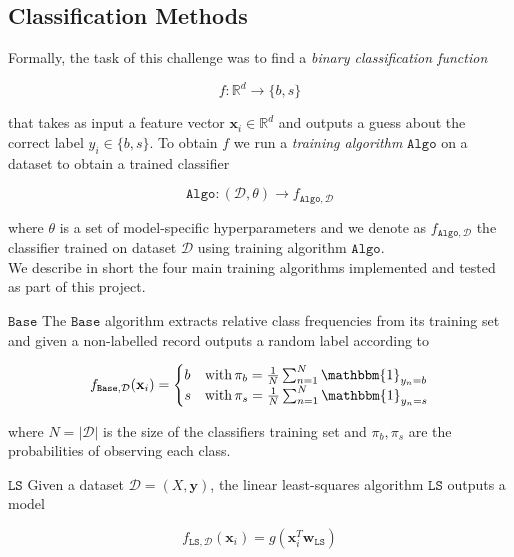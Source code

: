 \documentclass[10pt,conference,compsocconf]{IEEEtran}
\newcommand{\parabf}[1]{\vspace{1mm}\noindent\textbf{#1}}
\newcommand{\Data}{\mathcal{D}}
\newcommand{\features}{\mathbf{x}_i}
\newcommand{\target}{y_i}
\newcommand{\targetset}{\{ b, s \}}
\newcommand{\targetvector}{\mathbf{y}}
\newcommand{\weights}{\mathbf{w}}
\newcommand{\classifier}[2]{f_{#1, #2}}
\newcommand{\Train}{\mathtt{Algo}}
\newcommand{\LeastSquares}{\mathtt{LS}}
\newcommand{\Baseline}{\mathtt{Base}}
\begin{document}
\subsection{Classification Methods}
Formally, the task of this challenge was to find a \emph{binary classification function}

\begin{equation}
	f: \mathbb{R}^d \rightarrow \targetset
\end{equation}

that takes as input a feature vector $\features \in \mathbb{R}^d$ and outputs a guess about the correct label $\target \in \targetset$. To obtain $f$ we run a \emph{training algorithm} $\Train$ on a dataset to obtain a trained classifier

\begin{equation}
	\Train: (\Data, \theta) \rightarrow \classifier{\Train}{\Data}
\end{equation}

where $\theta$ is a set of model-specific hyperparameters and we denote as $\classifier{\Train}{\Data}$ the classifier trained on dataset $\Data$ using training algorithm $\Train$.\\

We describe in short the four main training algorithms implemented and tested as part of this project.

\parabf{$\Baseline$} The $\Baseline$ algorithm extracts relative class frequencies from its training set and given a non-labelled record outputs a random label according to

\begin{equation}
	\classifier{\Baseline}{\Data}(\features) = 
	\begin{cases}
	b &\mbox{with}\,  \pi_b = \frac{1}{N} \sum_{n=1}^N{\mathbbm{1}_{y_n = b}}\\
	s &\mbox{with}\,  \pi_s = \frac{1}{N} \sum_{n=1}^N{\mathbbm{1}_{y_n = s}}
	\end{cases}
\end{equation}

where $N = |\Data|$ is the size of the classifiers training set and $\pi_b, \pi_s$ are the probabilities of observing each class. 

\parabf{$\LeastSquares$} Given a dataset $\Data = (X, \targetvector)$, the linear least-squares algorithm $\LeastSquares$ outputs a model

\begin{equation}
	\classifier{\LeastSquares}{\Data}(\features) = g(\features^T \weights_{\LeastSquares})
\end{equation}
\end{document}
